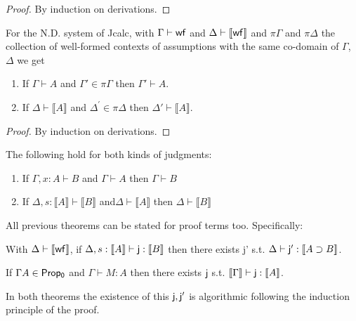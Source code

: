 \begin{proof}
By induction on derivations.
\end{proof}
\begin{theorem}[Permutation]
For the N.D. system of Jcalc, with $\Gamma\vdash \sf wf$ and $\Delta\vdash\llbracket {\sf wf}\rrbracket $ and $\pi \Gamma$ and $\pi \Delta$ the collection of well-formed contexts of assumptions with the same co-domain of $\Gamma$, $\Delta$ we get
\begin{enumerate}
\item If  $\Gamma\vdash   A$ and $\Gamma'\in \pi{\Gamma}$ then $\Gamma'\vdash   A$.
\item If  $\Delta\vdash \llbracket   A\rrbracket$ and $\Delta^{'}\in \pi \Delta$ then  $ \Delta'\vdash \llbracket   A\rrbracket$.
\end{enumerate}
\end{theorem}
\begin{proof}
By induction on derivations.
\end{proof}
\begin{theorem}
The following hold for both kinds of judgments:
\begin{enumerate}
\item If  $\Gamma,x:A\vdash B$ and $\Gamma\vdash  A$ then $\Gamma\vdash B$ 
\item If  $\Delta,s:\llbracket A \rrbracket \vdash \llbracket B\rrbracket$ and$\Delta\vdash  \llbracket A\rrbracket$ then  $\Delta\vdash\llbracket B\rrbracket$ 
\end{enumerate}
\end{theorem}
All previous  theorems can be stated for proof terms too. Specifically:
\begin{theorem}
	\label{deductterms}
	With $\Delta\vdash \llbracket\sf wf\rrbracket$, if $\Delta, s:\llbracket   A\rrbracket \vdash {\sf j}:\llbracket B \rrbracket $ then there exists {\sf j'} s.t. $\Delta \vdash {\sf j'}:\llbracket   A \supset B \rrbracket $. 
\end{theorem}
\begin{lemma}
\label{highorder}
	If $\Gamma A \in {\sf Prop_0}$ and $\Gamma\vdash M: A$ then there exists ${\sf j}$ s.t. $\llbracket \Gamma\rrbracket \vdash {\sf j}:\llbracket   A \rrbracket$. 
\end{lemma}
In both theorems the existence of this ${\sf j,j'}$ is algorithmic following the induction
principle of the proof. 


